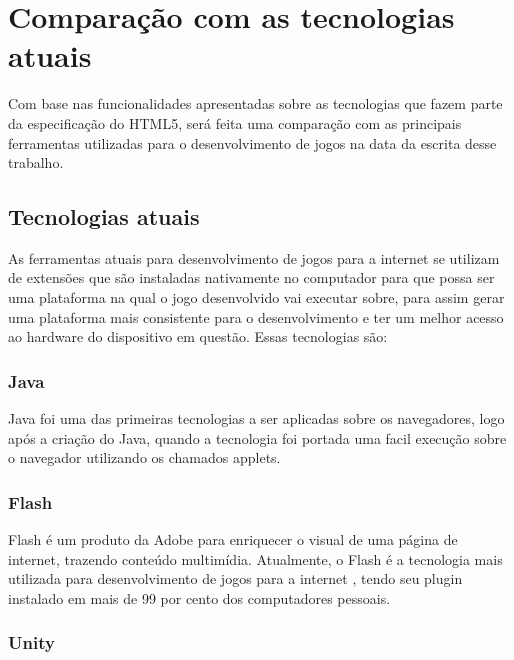 \section{Comparação com as tecnologias atuais}

Com base nas funcionalidades apresentadas sobre as tecnologias que
fazem parte da especificação do HTML5, será feita uma comparação com
as principais ferramentas utilizadas para o desenvolvimento de jogos
na data da escrita desse trabalho.

\subsection{Tecnologias atuais}

As ferramentas atuais para desenvolvimento de jogos para a internet se
utilizam de extensões que são instaladas nativamente no computador
para que possa ser uma plataforma na qual o jogo desenvolvido vai
executar sobre, para assim gerar uma plataforma mais consistente para
o desenvolvimento e ter um melhor acesso ao hardware do dispositivo em
questão. Essas tecnologias são:

\subsubsection{Java}

Java foi uma das primeiras tecnologias a ser aplicadas sobre os
navegadores, logo após a criação do Java, quando a tecnologia foi
portada uma facil execução sobre o navegador utilizando os chamados
applets.

\subsubsection{Flash}

Flash é um produto da Adobe para enriquecer o visual de uma página
de internet, trazendo conteúdo multimídia. Atualmente, o Flash é a
tecnologia mais utilizada para desenvolvimento de jogos para a
internet \cite{adobeflashleading}, tendo seu plugin instalado em mais de 99 por cento dos
computadores pessoais. \cite{adobeflashpenetration}


\subsubsection{Unity}

